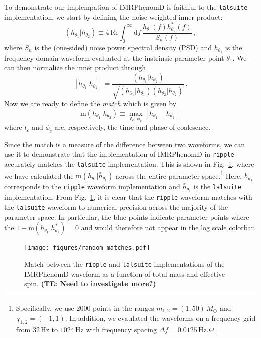 \documentclass[twocolumn]{aastex631}
\newcommand{\ripple}{\texttt{ripple}\xspace}
\newcommand{\lalsuite}{\texttt{lalsuite}\xspace}
\newcommand{\te}[1]{\textbf{\color{pyGreen}(TE: #1)}}
\begin{document}
To demonstrate our implempation of IMRPhenomD is faithful to the \lalsuite implementation, we start by defining the noise weighted inner product:
\begin{equation}
    \left(h_{\theta_1}|h_{\theta_2}\right) \equiv 4 \, \mathrm{Re} \int^{\infty}_{0} \mathrm{d} f \, \frac{ h_{\theta_1}(f) h^*_{\theta_2}(f)}{S_n(f)}\, ,
\end{equation}
where $S_n$ is the (one-sided) noise power spectral density (PSD) and $h_{\theta_1}$ is the frequency domain waveform evaluated at the instrinsic parameter point $\theta_1$.
We can then normalize the inner product through
\begin{equation}
    \left[h_{\theta_1}|h_{\theta_2}\right] = \frac{\left(h_{\theta_1}|h_{\theta_2}\right)}{\sqrt{\left(h_{\theta_1}|h_{\theta_1}\right)\left(h_{\theta_2}|h_{\theta_2}\right)}}\, .
\end{equation}
Now we are ready to define the \textit{match} which is given by 
\begin{equation}
    \mathrm{m}(h_{\theta_1}|h_{\theta_2}) \equiv \max_{t_c,\, \phi_c} \left[h_{\theta_1} \, \middle| \, h_{\theta_2} \right]\,
\end{equation}
where $t_c$ and $\phi_c$ are, respectively, the time and phase of coalesence.

Since the match is a measure of the difference between two waveforms, we can use it to demonstrate that the implementation of IMRPhenomD in \ripple accurately matches the \lalsuite implementation.
This is shown in Fig.~\ref{fig:match}, where we have calculated the $\mathrm{m}(h_{\theta_1}|\bar{h}_{\theta_1})$ across the entire parameter space.\footnote{
    Specifically, we use 2000 points in the ranges $m_{1,2} = (1,50)\,M_{\odot}$ and $\chi_{1,2} = (-1,1)$. In addition, we evaulated the waveforms on a frequency grid from $32\,$Hz to $1024\,$Hz with frequency spacing $\Delta f = 0.0125 \,$Hz.
}
Here, $h_{\theta_1}$ corresponds to the \ripple waveform implementation and $\bar{h}_{\theta_1}$ is the \lalsuite implementation. 
From Fig.~\ref{fig:match}, it is clear that the \ripple waveform matches with the \lalsuite waveform to numerical precision across the majority of the parameter space.
In particular, the blue points indicate parameter points where the $1-\mathrm{m}(h_{\theta_1}|h^{*}_{\theta_1})=0$ and would therefore not appear in the log scale colorbar.
\begin{figure}[t]
    \begin{centering}
        \texttt{[image: figures/random\_matches.pdf]}
        \caption{
            Match between the \ripple and \lalsuite implementations of the IMRPhenomD waveform as a function of total mass and effective spin.
            \te{Need to investigate more?}
        }
        \label{fig:match}
    \end{centering}
\end{figure}
\end{document}
